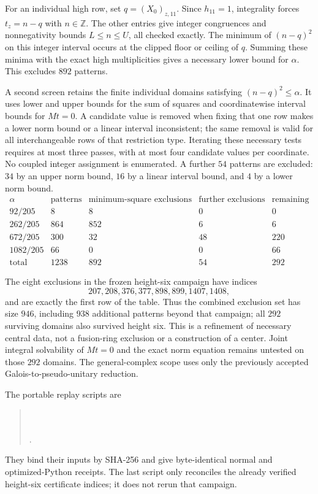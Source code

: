 For an individual high row, set $q=(X_0)_{z,11}$. Since $h_{11}=1$,
integrality forces $t_z=n-q$ with $n\in\mathbb Z$. The other entries give
integer congruences and nonnegativity bounds $L\leq n\leq U$, all checked
exactly. The minimum of $(n-q)^2$ on this integer interval occurs at the
clipped floor or ceiling of $q$. Summing these minima with the exact high
multiplicities gives a necessary lower bound for $\alpha$.
This excludes $892$ patterns.

A second screen retains the finite individual domains satisfying
$(n-q)^2\leq\alpha$. It uses lower and upper bounds for the sum of squares
and coordinatewise interval bounds for $Mt=0$. A candidate value is removed
when fixing that one row makes a lower norm bound or a linear interval
inconsistent; the same removal is valid for all interchangeable rows of that
restriction type. Iterating these necessary tests requires at most three
passes, with at most four candidate values per coordinate. No coupled
integer assignment is enumerated. A further $54$ patterns are excluded:
$34$ by an upper norm bound, $16$ by a linear interval bound, and $4$ by a
lower norm bound.
\[
\begin{array}{c|r|r|r|r}
\alpha&\text{patterns}&\text{minimum-square exclusions}&
\text{further exclusions}&\text{remaining}\\\hline
92/205&8&8&0&0\\
262/205&864&852&6&6\\
672/205&300&32&48&220\\
1082/205&66&0&0&66\\\hline
\text{total}&1238&892&54&292
\end{array}
\]

The eight exclusions in the frozen height-six campaign have indices
\[207,208,376,377,898,899,1407,1408,\]
and are exactly the first row of the table.
Thus the combined exclusion set has size $946$, including $938$ additional
patterns beyond that campaign; all $292$ surviving domains also survived
height six. This is a refinement of necessary central data, not a fusion-ring
exclusion or a construction of a center. Joint integral solvability of
$Mt=0$ and the exact norm equation remains untested on those $292$ domains.
The general-complex scope uses only the previously accepted
Galois-to-pseudo-unitary reduction.

The portable replay scripts are
\begin{quote}\small
{}\\
\\
.
\end{quote}
They bind their inputs by SHA-256 and give
byte-identical normal and optimized-Python receipts. The last script only
reconciles the already verified height-six certificate indices; it does not
rerun that campaign.

